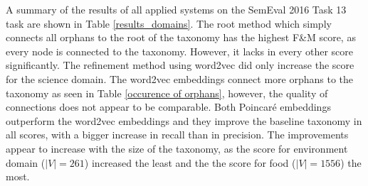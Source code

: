 \documentclass[12pt, headsepline, a4paper]{scrartcl}
\begin{document}
\begin{table}[!htbp]
	\centering
		\caption{
			Comparison between baseline results and refinement methods applied to all three domains of the SemEval2016 Task. Highest result for each domain is emphasized.
		}
		\label{results_domains}
	\end{table}



A summary of the results of all applied systems on the SemEval 2016 Task 13 task are shown in Table \ref{results_domains}. 
The root method which simply connects all orphans to the root of the taxonomy has the highest F\&M score, as every node is connected to the taxonomy. However, it lacks in every other score significantly. The refinement method using word2vec did only increase the score for the science domain. The word2vec embeddings connect more orphans to the taxonomy as seen in Table \ref{occurence of orphans}, however, the quality of connections does not appear to be comparable.
Both Poincaré embeddings outperform the word2vec embeddings and they improve the baseline taxonomy in all scores, with a bigger increase in recall than in precision. The improvements appear to increase with the size of the taxonomy, as the score for environment domain ($|V| = 261$) increased the least and the the score for food ($|V| = 1556$) the most. 
\end{document}
